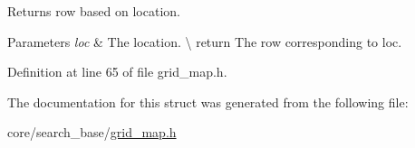 Returns row based on location. 


\begin{DoxyParams}{Parameters}
{\em loc} & The location. \textbackslash{} return The row corresponding to {\ttfamily loc}. \\
\hline
\end{DoxyParams}


Definition at line 65 of file grid\+\_\+map.\+h.



The documentation for this struct was generated from the following file\+:\begin{DoxyCompactItemize}
\item 
core/search\+\_\+base/\hyperlink{grid__map_8h}{grid\+\_\+map.\+h}\end{DoxyCompactItemize}

